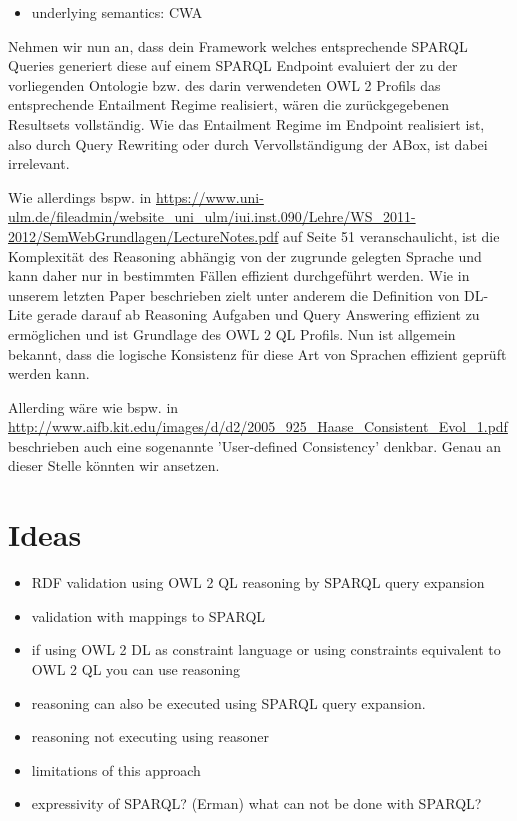 \documentclass{llncs}
\begin{document}
\begin{itemize}
	\item underlying semantics: CWA
\end{itemize}

Nehmen wir nun an, dass dein Framework welches entsprechende SPARQL Queries generiert diese auf einem SPARQL Endpoint evaluiert der zu der vorliegenden Ontologie bzw. des darin verwendeten OWL 2 Profils das entsprechende Entailment Regime realisiert, wären die zurückgegebenen Resultsets vollständig. Wie das Entailment Regime im Endpoint realisiert ist, also durch Query Rewriting oder durch Vervollständigung der ABox, ist dabei irrelevant.

Wie allerdings bspw. in 
\url{https://www.uni-ulm.de/fileadmin/website_uni_ulm/iui.inst.090/Lehre/WS_2011-2012/SemWebGrundlagen/LectureNotes.pdf}
auf Seite 51 veranschaulicht, ist die Komplexität des Reasoning abhängig von der zugrunde gelegten Sprache und kann daher nur in bestimmten Fällen effizient durchgeführt werden. Wie in unserem letzten Paper beschrieben zielt unter anderem die Definition von DL-Lite gerade darauf ab Reasoning Aufgaben und Query Answering effizient zu ermöglichen und ist Grundlage des OWL 2 QL Profils. Nun ist allgemein bekannt, dass die logische Konsistenz für diese Art von Sprachen effizient geprüft werden kann. 

Allerding wäre wie bspw. in 
\url{http://www.aifb.kit.edu/images/d/d2/2005_925_Haase_Consistent_Evol_1.pdf} beschrieben auch eine sogenannte 'User-defined Consistency' denkbar. Genau an dieser Stelle könnten wir ansetzen.

\section{Ideas}

\begin{itemize}
	\item RDF validation using OWL 2 QL reasoning by SPARQL query expansion
	\item validation with mappings to SPARQL
	\item if using OWL 2 DL as constraint language or using constraints equivalent to OWL 2 QL you can use reasoning 
	\item reasoning can also be executed using SPARQL query expansion.
	\item reasoning not executing using reasoner
	\item limitations of this approach
	\item expressivity of SPARQL? (Erman) what can not be done with SPARQL?
\end{itemize}
\end{document}
